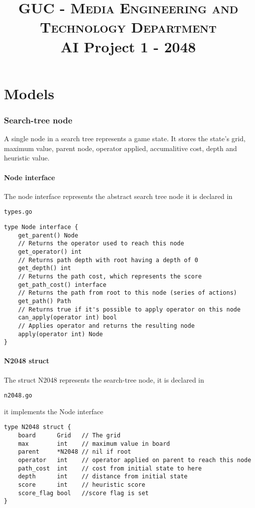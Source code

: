 \documentclass[14pt,a4paper]{report}
\begin{document}
\title{
    \textsc{GUC - Media Engineering and Technology Department} \\
    AI Project 1 - 2048
}


\renewcommand{\abstractname}{Brief}
\begin{abstract}

\end{abstract}

\tableofcontents

\part{Models}

\section{Search-tree node}
A single node in a search tree represents a game state. It stores the state's 
grid, maximum value, parent node, operator applied, accumalitive cost, depth and
heuristic value. 



\subsection{Node interface}
The node interface represents the abstract search tree node it is declared
in \begin{verbatim}types.go\end{verbatim}
\begin{lstlisting}
type Node interface {
    get_parent() Node
    // Returns the operator used to reach this node
    get_operator() int
    // Returns path depth with root having a depth of 0
    get_depth() int
    // Returns the path cost, which represents the score
    get_path_cost() interface
    // Returns the path from root to this node (series of actions)
    get_path() Path
    // Returns true if it's possible to apply operator on this node
    can_apply(operator int) bool
    // Applies operator and returns the resulting node
    apply(operator int) Node
}
\end{lstlisting}

\subsection{N2048 struct}
The struct N2048 represents the search-tree node, it is declared in 
\begin{verbatim}n2048.go\end{verbatim} it implements the Node interface 
\begin{lstlisting}
type N2048 struct {
    board      Grid   // The grid
    max        int    // maximum value in board
    parent     *N2048 // nil if root
    operator   int    // operator applied on parent to reach this node
    path_cost  int    // cost from initial state to here
    depth      int    // distance from initial state
    score      int    // heuristic score
    score_flag bool   //score flag is set
}
\end{lstlisting}
\vfill
\end{document}
